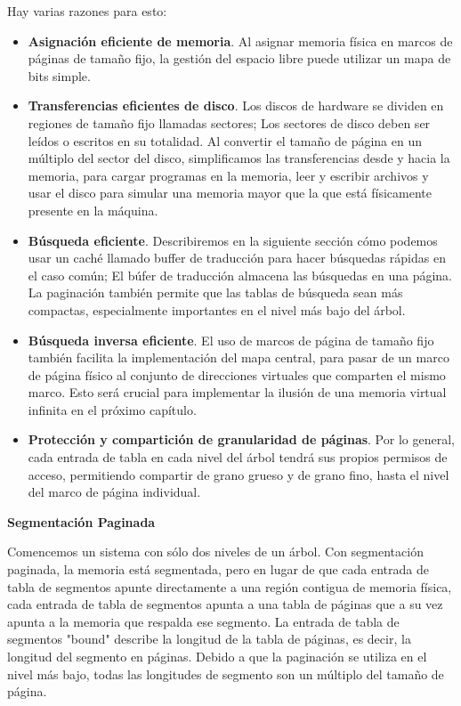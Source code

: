 \documentclass[10pt]{book}
\begin{document}
Hay varias razones para esto:
\begin{itemize}
\item \textbf{Asignación eficiente de memoria}. Al asignar memoria física en marcos de páginas de tamaño fijo, la gestión del espacio libre puede utilizar un mapa de bits simple.

\item \textbf{Transferencias eficientes de disco}. Los discos de hardware se dividen en regiones de tamaño fijo llamadas sectores; Los sectores de disco deben ser leídos o escritos en su totalidad. Al convertir el tamaño de página en un múltiplo del sector del disco, simplificamos las transferencias desde y hacia la memoria, para cargar programas en la memoria, leer y escribir archivos y usar el disco para simular una memoria mayor que la que está físicamente presente en la máquina.

\item \textbf{Búsqueda eficiente}. Describiremos en la siguiente sección cómo podemos usar un caché llamado buffer de traducción para hacer búsquedas rápidas en el caso común; El búfer de traducción almacena las búsquedas en una página. La paginación también permite que las tablas de búsqueda sean más compactas, especialmente importantes en el nivel más bajo del árbol.

\item \textbf{Búsqueda inversa eficiente}. El uso de marcos de página de tamaño fijo también facilita la implementación del mapa central, para pasar de un marco de página físico al conjunto de direcciones virtuales que comparten el mismo marco. Esto será crucial para implementar la ilusión de una memoria virtual infinita en el próximo capítulo.

\item \textbf{Protección y compartición de granularidad de páginas}. Por lo general, cada entrada de tabla en cada nivel del árbol tendrá sus propios permisos de acceso, permitiendo compartir de grano grueso y de grano fino, hasta el nivel del marco de página individual.
\end{itemize}

\textbf{Segmentación Paginada}

Comencemos un sistema con sólo dos niveles de un árbol. Con segmentación paginada, la memoria está segmentada, pero en lugar de que cada entrada de tabla de segmentos apunte directamente a una región contigua de memoria física, cada entrada de tabla de segmentos apunta a una tabla de páginas que a su vez apunta a la memoria que respalda ese segmento. La entrada de tabla de segmentos "bound" describe la longitud de la tabla de páginas, es decir, la longitud del segmento en páginas. Debido a que la paginación se utiliza en el nivel más bajo, todas las longitudes de segmento son un múltiplo del tamaño de página.
\end{document}
